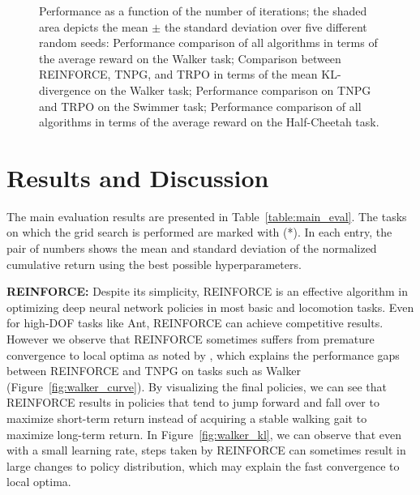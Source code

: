 \documentclass{article}
\begin{document}
\begin{figure*}[!t]
\caption{Performance as a function of the number of iterations; the shaded area depicts the mean $\pm$ the standard deviation over five different random seeds:  Performance comparison of all algorithms in terms of the average reward on the Walker task;  Comparison between REINFORCE, TNPG, and TRPO in terms of the mean KL-divergence on the Walker task;  Performance comparison on TNPG and TRPO on the Swimmer task;  Performance comparison of all algorithms in terms of the average reward on the Half-Cheetah task.}\label{fig:test}
\end{figure*}



\section{Results and Discussion}


\label{section:results}

The main evaluation results are presented in Table~\ref{table:main_eval}. The tasks on which the grid search is performed are marked with (*). In each entry, the pair of numbers shows the mean and standard deviation of the normalized cumulative return using the best possible hyperparameters.

{\bf REINFORCE:} Despite its simplicity, REINFORCE is an effective algorithm in optimizing deep neural network policies in most basic and locomotion tasks. Even for high-DOF tasks like Ant, REINFORCE can achieve competitive results. However we observe that REINFORCE sometimes suffers from premature convergence to local optima as noted by \citet{peters2008reinforcement}, which explains the performance gaps between REINFORCE and TNPG on tasks such as Walker (Figure~\ref{fig:walker_curve}). By visualizing the final policies, we can see that REINFORCE results in policies that tend to jump forward and fall over to maximize short-term return instead of acquiring a stable walking gait to maximize long-term return. In Figure~\ref{fig:walker_kl}, we can observe that even with a small learning rate, steps taken by REINFORCE can sometimes result in large changes to policy distribution, which may explain the fast convergence to local optima. 
\end{document}
